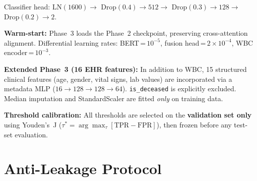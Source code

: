 \documentclass[conference]{IEEEtran}
\begin{document}
Classifier head: LN$(1600) \to$ Drop$(0.4) \to 512 \to$ Drop$(0.3) \to 128 \to$ Drop$(0.2) \to 2$.

\textbf{Warm-start:} Phase~3 loads the Phase~2 checkpoint, preserving cross-attention alignment. Differential learning rates: BERT\,=\,$10^{-5}$, fusion head\,=\,$2\times10^{-4}$, WBC encoder\,=\,$10^{-3}$.

\textbf{Extended Phase~3 (16 EHR features):} In addition to WBC, 15 structured clinical features (age, gender, vital signs, lab values) are incorporated via a metadata MLP ($16\to128\to128\to64$). \texttt{is\_deceased} is explicitly excluded. Median imputation and StandardScaler are fitted \emph{only} on training data.

\textbf{Threshold calibration:} All thresholds are selected on the \textbf{validation set only} using Youden's~J ($\tau^* = \arg\max_\tau[\text{TPR} - \text{FPR}]$), then frozen before any test-set evaluation.

\section{\textcolor{aideep}{Anti-Leakage Protocol}}
\label{sec:antileak}
\end{document}
